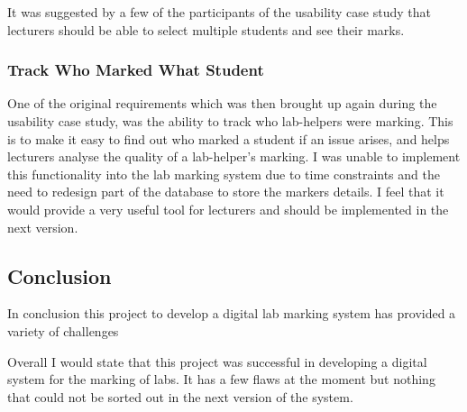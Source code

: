 \documentclass[12pt]{article}  %
\begin{document}
It was suggested by a few of the participants of the usability case study that lecturers should be able to select multiple students and see their marks.

\subsubsection{Track Who Marked What Student}

One of the original requirements which was then brought up again during the usability case study, was the ability to track who lab-helpers were marking. This is to make it easy to find out who marked a student if an issue arises, and helps lecturers analyse the quality of a lab-helper's marking. 
I was unable to implement this functionality into the lab marking system due to time constraints and the need to redesign part of the database to store the markers details. I feel that it would provide a very useful tool for lecturers and should be implemented in the next version.


\subsection{Conclusion}

In conclusion this project to develop a digital lab marking system has provided a variety of challenges

Overall I would state that this project was successful in developing a digital system for the marking of labs. It has a few flaws at the moment but nothing that could not be sorted out in the next version of the system.











\newpage
\printbibliography[heading=bibintoc]
\let\cleardoublepage\clearpage


\end{document}
